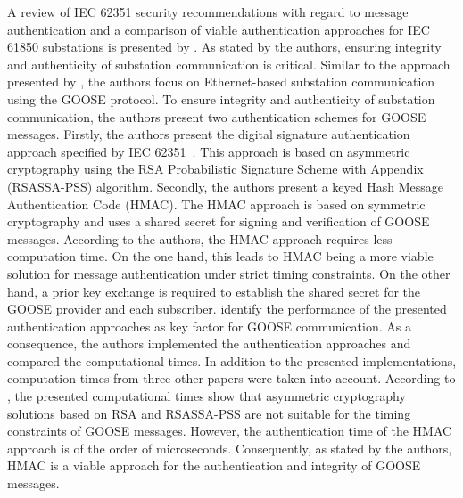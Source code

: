 A review of IEC 62351 security recommendations with regard to message authentication and a comparison of viable authentication approaches for IEC 61850 substations is presented by \citeauthor{Elbez2019} \cite{Elbez2019}.
As stated by the authors, ensuring integrity and authenticity of substation communication is critical.
Similar to the approach presented by \citeauthor{Ishchenko2018}, the authors focus on Ethernet-based substation communication using the GOOSE protocol.
To ensure integrity and authenticity of substation communication, the authors present two authentication schemes for GOOSE messages.
Firstly, the authors present the digital signature authentication approach specified by IEC 62351~\cite{IEC62351P6}.
This approach is based on asymmetric cryptography using the RSA Probabilistic Signature Scheme with Appendix (RSASSA-PSS) algorithm.
Secondly, the authors present a keyed Hash Message Authentication Code (HMAC).
The HMAC approach is based on symmetric cryptography and uses a shared secret for signing and verification of GOOSE messages.
According to the authors, the HMAC approach requires less computation time.
On the one hand, this leads to HMAC being a more viable solution for message authentication under strict timing constraints.
On the other hand, a prior key exchange is required to establish the shared secret for the GOOSE provider and each subscriber.
\citeauthor{Elbez2019} identify the performance of the presented authentication approaches as key factor for GOOSE communication.
As a consequence, the authors implemented the authentication approaches and compared the computational times.
In addition to the presented implementations, computation times from three other papers were taken into account.
According to \citeauthor{Elbez2019}, the presented computational times show that asymmetric cryptography solutions based on RSA and RSASSA-PSS are not suitable for the timing constraints of GOOSE messages.
However, the authentication time of the HMAC approach is of the order of microseconds.
Consequently, as stated by the authors, HMAC is a viable approach for the authentication and integrity of GOOSE messages.

